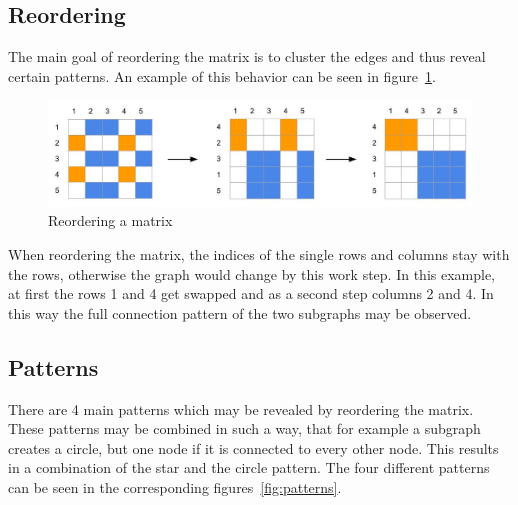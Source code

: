 \subsection{Reordering}

The main goal of reordering the matrix is to cluster the edges and thus reveal certain patterns. An example of this behavior can be seen in figure~\ref{fig:reorder}. 

\begin{figure}[h]
\includegraphics[width=\textwidth]{images/reorder}
\caption{Reordering a matrix\label{fig:reorder}}
\end{figure}


When reordering the matrix, the indices of the single rows and columns stay with the rows, otherwise the graph would change by this work step. In this example, at first the rows 1 and 4 get swapped and as a second step columns 2 and 4. In this way the full connection pattern of the two subgraphs may be observed. 

\subsection{Patterns}
There are 4 main patterns which may be revealed by reordering the matrix. These patterns may be combined in such a way, that for example a subgraph creates a circle, but one node if it is connected to every other node. This results in a combination of the star and the circle pattern. 
The four different patterns can be seen in the corresponding figures~\ref{fig:patterns}.

